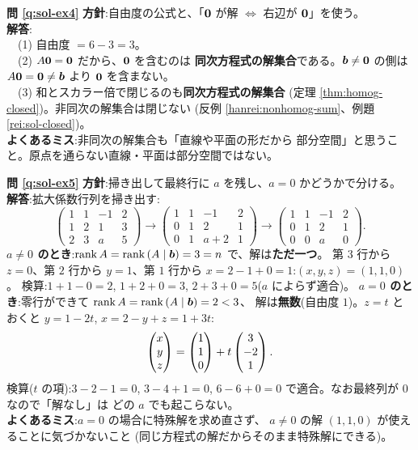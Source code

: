 \bigskip
\noindent\textbf{問 \ref{q:sol-ex4}}\quad
\textbf{方針}:自由度の公式と、「$\bm{0}$ が解 $\iff$ 右辺が
$\bm{0}$」を使う。\\
\textbf{解答}:\\
　(1) 自由度 $= 6 - 3 = 3$。\\
　(2) $A\bm{0} = \bm{0}$ だから、$\bm{0}$ を含むのは
\textbf{同次方程式の解集合}である。$\bm{b} \neq \bm{0}$ の側は
$A\bm{0} = \bm{0} \neq \bm{b}$ より $\bm{0}$ を含まない。\\
　(3) 和とスカラー倍で閉じるのも\textbf{同次方程式の解集合}
(定理 \ref{thm:homog-closed})。非同次の解集合は閉じない
(反例 \ref{hanrei:nonhomog-sum}、例題 \ref{rei:sol-closed})。\\
\textbf{よくあるミス}:非同次の解集合も「直線や平面の形だから
部分空間」と思うこと。原点を通らない直線・平面は部分空間ではない。

\bigskip
\noindent\textbf{問 \ref{q:sol-ex5}}\quad
\textbf{方針}:掃き出して最終行に $a$ を残し、$a = 0$ かどうかで分ける。\\
\textbf{解答}:拡大係数行列を掃き出す:
\[
\left(\begin{array}{ccc|c}
1 & 1 & -1 & 2 \\ 1 & 2 & 1 & 3 \\ 2 & 3 & a & 5
\end{array}\right)
\longrightarrow
\left(\begin{array}{ccc|c}
1 & 1 & -1 & 2 \\ 0 & 1 & 2 & 1 \\ 0 & 1 & a + 2 & 1
\end{array}\right)
\longrightarrow
\left(\begin{array}{ccc|c}
1 & 1 & -1 & 2 \\ 0 & 1 & 2 & 1 \\ 0 & 0 & a & 0
\end{array}\right).
\]
\textbf{$a \neq 0$ のとき}:$\mathrm{rank}\,A =
\mathrm{rank}\,(A \mid \bm{b}) = 3 = n$ で、解は\textbf{ただ一つ}。
第 $3$ 行から $z = 0$、第 $2$ 行から $y = 1$、第 $1$ 行から
$x = 2 - 1 + 0 = 1$:$(x, y, z) = (1, 1, 0)$。
検算:$1 + 1 - 0 = 2$, $1 + 2 + 0 = 3$, $2 + 3 + 0 = 5$($a$ によらず適合)。
\textbf{$a = 0$ のとき}:零行ができて
$\mathrm{rank}\,A = \mathrm{rank}\,(A \mid \bm{b}) = 2 < 3$、
解は\textbf{無数}(自由度 $1$)。$z = t$ とおくと $y = 1 - 2t$,
$x = 2 - y + z = 1 + 3t$:
\[
\begin{pmatrix}x \\ y \\ z\end{pmatrix} = \begin{pmatrix}1 \\ 1 \\ 0\end{pmatrix} + t\begin{pmatrix}3 \\ -2 \\ 1\end{pmatrix}.
\]
検算($t$ の項):$3 - 2 - 1 = 0$, $3 - 4 + 1 = 0$,
$6 - 6 + 0 = 0$ で適合。なお最終列が $0$ なので「解なし」は
どの $a$ でも起こらない。\\
\textbf{よくあるミス}:$a = 0$ の場合に特殊解を求め直さず、
$a \neq 0$ の解 $(1,1,0)$ が使えることに気づかないこと
(同じ方程式の解だからそのまま特殊解にできる)。

